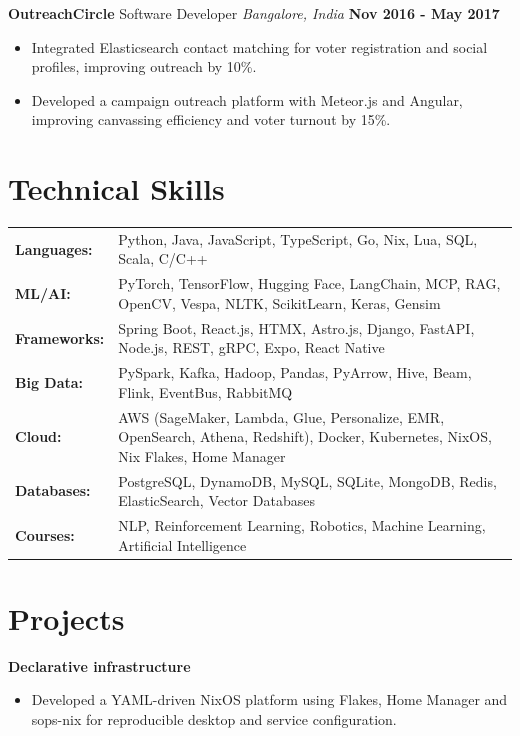 \documentclass[10pt, letterpaper]{article}
\newcommand{\jobentry}[4]{
  \noindent\textbf{#1} \hfill #2 \hfill \textit{#3} \hfill \textbf{#4}
}
\newcommand{\projectentry}[2]{
  \noindent{#1} \hfill \textbf{#2}
}
\begin{document}
\jobentry{OutreachCircle}{Software Developer}{Bangalore, India}{Nov 2016 - May 2017}
\begin{itemize}
\item Integrated Elasticsearch contact matching for voter registration and social profiles, improving outreach by 10\%.
\item Developed a campaign outreach platform with Meteor.js and Angular, improving canvassing efficiency and voter turnout by 15\%.
\end{itemize}

\section{Technical Skills}
\noindent
\begin{tabularx}{\textwidth}{@{} l X @{}}
	\textbf{Languages:}  & Python, Java, JavaScript, TypeScript, Go, Nix, Lua, SQL, Scala, C/C++                             \\
	\textbf{ML/AI:}      & PyTorch, TensorFlow, Hugging Face, LangChain, MCP, RAG, OpenCV, Vespa, NLTK, ScikitLearn, Keras, Gensim     \\
	\textbf{Frameworks:} & Spring Boot, React.js, HTMX, Astro.js, Django, FastAPI, Node.js, REST, gRPC, Expo, React Native                                \\
	\textbf{Big Data:}   & PySpark, Kafka, Hadoop, Pandas, PyArrow, Hive, Beam, Flink, EventBus, RabbitMQ                    \\
	\textbf{Cloud:}      & AWS (SageMaker, Lambda, Glue, Personalize, EMR, OpenSearch, Athena, Redshift), Docker, Kubernetes, NixOS, Nix Flakes, Home Manager \\
	\textbf{Databases:}  & PostgreSQL, DynamoDB, MySQL, SQLite, MongoDB, Redis, ElasticSearch, Vector Databases              \\
	\textbf{Courses:}    & NLP, Reinforcement Learning, Robotics, Machine Learning, Artificial Intelligence                  \\
\end{tabularx}

\section{Projects}

\projectentry{Lumino}{Declarative infrastructure}
\begin{itemize}
\item Developed a YAML-driven NixOS platform using Flakes, Home Manager and sops-nix for reproducible desktop and service configuration.
\end{itemize}
\end{document}
